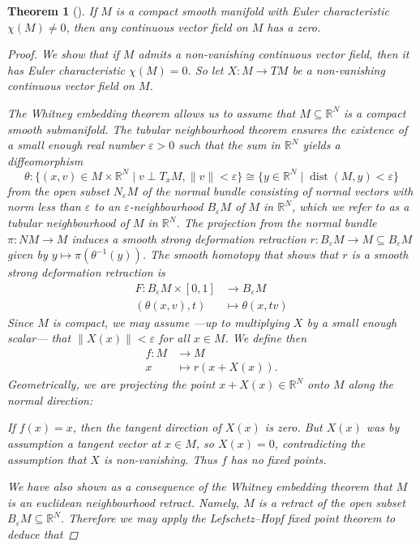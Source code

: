 \documentclass[A4paper, 12pt, british, reqno]{amsart}
\newcommand{\R}{\mathbb{R}} %
\theoremstyle{plain}
\newtheorem{thm}{Theorem}[section]
\theoremstyle{definition}
\theoremstyle{remark}
\theoremstyle{plain}
\theoremstyle{definition}
\theoremstyle{remark}
\theoremstyle{plain}
\theoremstyle{definition}
\theoremstyle{remark}
\begin{document}
\begin{thm}[{\cite[Corollary IV.23.6]{bre93}}]
    If $M$ is a compact smooth manifold with Euler characteristic $\chi(M)\neq 0$, then any continuous vector field on $M$ has a zero.
    \begin{proof}
	We show that if $M$ admits a non-vanishing continuous vector field, then it has Euler characteristic $\chi(M)=0$.
	So let $X\colon M\to TM$ be a non-vanishing continuous vector field on $M$.

	The Whitney embedding theorem \cite[Theorem II.10.7]{bre93} allows us to assume that $M\subseteq \R^{N}$ is a compact smooth submanifold.
	The tubular neighbourhood theorem \cite[Theorem II.11.4]{bre93} ensures the existence of a small enough real number $\varepsilon >0$ such that the sum in $\R^{N}$ yields a diffeomorphism
	\[ \theta\colon \{ (x,v)\in M\times \R^{N}\mid v\perp T_{x}M, \lVert v \rVert<\varepsilon \} \cong \{ y\in \R^{N}\mid \operatorname{dist}(M,y)<\varepsilon\} \]
	from the open subset $N_{\varepsilon}M$ of the normal bundle consisting of normal vectors with norm less than $\varepsilon$ to an $\varepsilon$-neighbourhood $B_{\varepsilon}M$ of $M$ in $\R^{N}$, which we refer to as a \textit{tubular neighbourhood} of $M$ in $\R^{N}$.
	The projection from the normal bundle $\pi\colon NM\to M$ induces a smooth strong deformation retraction $r\colon B_{\varepsilon}M\to M\subseteq B_{\varepsilon}M$ given by $y\mapsto \pi(\theta^{-1}(y))$.
	The smooth homotopy that shows that $r$ is a smooth strong deformation retraction \cite[Definition I.14.8]{bre93} is
	\begin{align*}
	    F\colon B_{\varepsilon}M\times [0,1] & \longrightarrow B_{\varepsilon}M \\
	    (\theta(x,v),t) & \longmapsto \theta(x,tv)
	\end{align*}
	Since $M$ is compact, we may assume ---up to multiplying $X$ by a small enough scalar--- that $\lVert X(x) \rVert<\varepsilon$ for all $x\in M$.
	We define then
	\begin{align*}
	    f\colon M &\longrightarrow M\\
	    x &\longmapsto r(x+X(x)).
	\end{align*}
	Geometrically, we are projecting the point $x+X(x)\in \R^{N}$ onto $M$ along the normal direction:


	If $f(x)=x$, then the tangent direction of $X(x)$ is zero.
	But $X(x)$ was by assumption a tangent vector at $x\in M$, so $X(x)=0$, contradicting the assumption that $X$ is non-vanishing.
	Thus $f$ has no fixed points.

	We have also shown as a consequence of the Whitney embedding theorem that $M$ is an euclidean neighbourhood retract.
	Namely, $M$ is a retract of the open subset $B_{\varepsilon}M\subseteq \R^{N}$.
	Therefore we may apply the Lefschetz--Hopf fixed point theorem \cite[Corollary IV.23.5]{bre93} to deduce that
    \end{proof}
\end{thm}



\vfill
\end{document}
